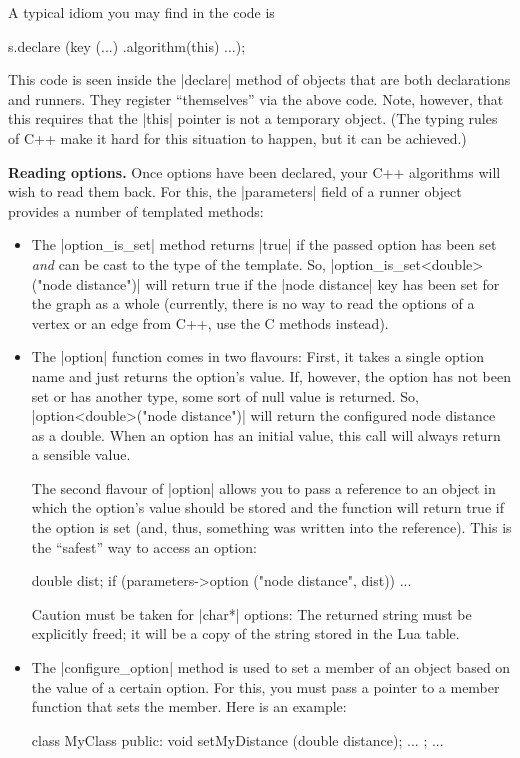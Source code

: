 A typical idiom you may find in the code is
%
\begin{codeexample}[code only, tikz syntax=false]
s.declare (key (...)
           .algorithm(this)
           ...);
\end{codeexample}
%
This code is seen inside the |declare| method of objects that are both
declarations and runners. They register ``themselves'' via the above code.
Note, however, that this requires that the |this| pointer is not a temporary
object. (The typing rules of C++ make it hard for this situation to happen, but
it can be achieved.)


\medskip
\noindent\textbf{Reading options.} Once options have been declared, your C++
algorithms will wish to read them back. For this, the |parameters| field of a
runner object provides a number of templated methods:
%
\begin{itemize}
    \item The |option_is_set| method returns |true| if the passed option has
        been set \emph{and} can be cast to the type of the template. So,
        |option_is_set<double>("node distance")| will return true if the
        |node distance| key has been set for the graph as a whole (currently,
        there is no way to read the options of a vertex or an edge from C++,
        use the C methods instead).
    \item The |option| function comes in two flavours: First, it takes a single
        option name and just returns the option's value. If, however, the
        option has not been set or has another type, some sort of null value is
        returned. So, |option<double>("node distance")| will return the
        configured node distance as a double. When an option has an initial
        value, this call will always return a sensible value.

        The second flavour of |option| allows you to pass a reference to an
        object in which the option's value should be stored and the function
        will return true if the option is set (and, thus, something was written
        into the reference). This is the ``safest'' way to access an option:
\begin{codeexample}[code only, tikz syntax=false]
double dist;
if (parameters->option ("node distance", dist))
  ...
\end{codeexample}

        Caution must be taken for |char*| options: The returned string must be
        explicitly freed; it will be a copy of the string stored in the Lua
        table.
    \item The |configure_option| method is used to set a member of an object
        based on the value of a certain option. For this, you must pass a
        pointer to a member function that sets the member. Here is an example:
\begin{codeexample}[code only, tikz syntax=false]
class MyClass {
public:
  void setMyDistance (double distance);
...
};
...


\end{codeexample}
\end{itemize}
